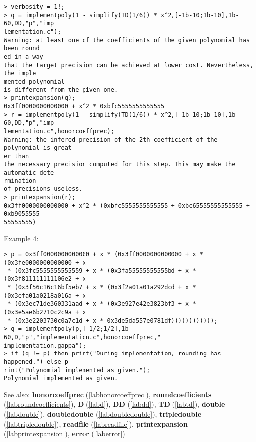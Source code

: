 \begin{center}\begin{minipage}{15cm}\begin{Verbatim}[frame=single]
> verbosity = 1!;
> q = implementpoly(1 - simplify(TD(1/6)) * x^2,[-1b-10;1b-10],1b-60,DD,"p","imp
lementation.c");
Warning: at least one of the coefficients of the given polynomial has been round
ed in a way
that the target precision can be achieved at lower cost. Nevertheless, the imple
mented polynomial
is different from the given one.
> printexpansion(q);
0x3ff0000000000000 + x^2 * 0xbfc5555555555555
> r = implementpoly(1 - simplify(TD(1/6)) * x^2,[-1b-10;1b-10],1b-60,DD,"p","imp
lementation.c",honorcoeffprec);
Warning: the infered precision of the 2th coefficient of the polynomial is great
er than
the necessary precision computed for this step. This may make the automatic dete
rmination
of precisions useless.
> printexpansion(r);
0x3ff0000000000000 + x^2 * (0xbfc5555555555555 + 0xbc65555555555555 + 0xb9055555
55555555)
\end{Verbatim}
\end{minipage}\end{center}
\noindent Example 4: 
\begin{center}\begin{minipage}{15cm}\begin{Verbatim}[frame=single]
> p = 0x3ff0000000000000 + x * (0x3ff0000000000000 + x * (0x3fe0000000000000 + x
 * (0x3fc5555555555559 + x * (0x3fa55555555555bd + x * (0x3f811111111106e2 + x
 * (0x3f56c16c16bf5eb7 + x * (0x3f2a01a01a292dcd + x * (0x3efa01a0218a016a + x
 * (0x3ec71de360331aad + x * (0x3e927e42e3823bf3 + x * (0x3e5ae6b2710c2c9a + x
 * (0x3e2203730c0a7c1d + x * 0x3de5da557e0781df))))))))))));
> q = implementpoly(p,[-1/2;1/2],1b-60,D,"p","implementation.c",honorcoeffprec,"
implementation.gappa");
> if (q != p) then print("During implementation, rounding has happened.") else p
rint("Polynomial implemented as given.");    
Polynomial implemented as given.
\end{Verbatim}
\end{minipage}\end{center}
See also: \textbf{honorcoeffprec} (\ref{labhonorcoeffprec}), \textbf{roundcoefficients} (\ref{labroundcoefficients}), \textbf{D} (\ref{labd}), \textbf{DD} (\ref{labdd}), \textbf{TD} (\ref{labtd}), \textbf{double} (\ref{labdouble}), \textbf{doubledouble} (\ref{labdoubledouble}), \textbf{tripledouble} (\ref{labtripledouble}), \textbf{readfile} (\ref{labreadfile}), \textbf{printexpansion} (\ref{labprintexpansion}), \textbf{error} (\ref{laberror})
